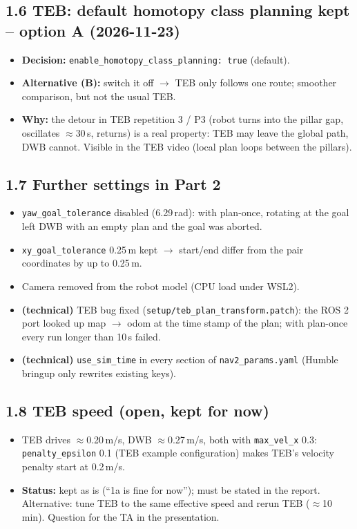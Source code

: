 \documentclass[10pt]{article}
\newcommand{\pkg}[1]{\texttt{#1}}
\begin{document}
\subsection*{1.6 TEB: default homotopy class planning kept -- option A (2026-11-23)}
\begin{itemize}
  \item \textbf{Decision:} \pkg{enable\_homotopy\_class\_planning: true} (default).
  \item \textbf{Alternative (B):} switch it off $\rightarrow$ TEB only follows one route; smoother comparison, but not the usual TEB.
  \item \textbf{Why:} the detour in TEB repetition 3 / P3 (robot turns into the pillar gap, oscillates $\approx$30\,s, returns) is a real property: TEB may leave the global path, DWB cannot. Visible in the TEB video (local plan loops between the pillars).
\end{itemize}

\subsection*{1.7 Further settings in Part 2}
\begin{itemize}
  \item \pkg{yaw\_goal\_tolerance} disabled (6.29\,rad): with plan-once, rotating at the goal left DWB with an empty plan and the goal was aborted.
  \item \pkg{xy\_goal\_tolerance} 0.25\,m kept $\rightarrow$ start/end differ from the pair coordinates by up to 0.25\,m.
  \item Camera removed from the robot model (CPU load under WSL2).
  \item \textbf{(technical)} TEB bug fixed (\pkg{setup/teb\_plan\_transform.patch}): the ROS 2 port looked up map $\rightarrow$ odom at the time stamp of the plan; with plan-once every run longer than 10\,s failed.
  \item \textbf{(technical)} \pkg{use\_sim\_time} in every section of \pkg{nav2\_params.yaml} (Humble bringup only rewrites existing keys).
\end{itemize}

\subsection*{1.8 TEB speed (open, kept for now)}
\begin{itemize}
  \item TEB drives $\approx$0.20\,m/s, DWB $\approx$0.27\,m/s, both with \pkg{max\_vel\_x} 0.3: \pkg{penalty\_epsilon} 0.1 (TEB example configuration) makes TEB's velocity penalty start at 0.2\,m/s.
  \item \textbf{Status:} kept as is (``1a is fine for now''); must be stated in the report. Alternative: tune TEB to the same effective speed and rerun TEB ($\approx$10\,min). Question for the TA in the presentation.
\end{itemize}
\end{document}
